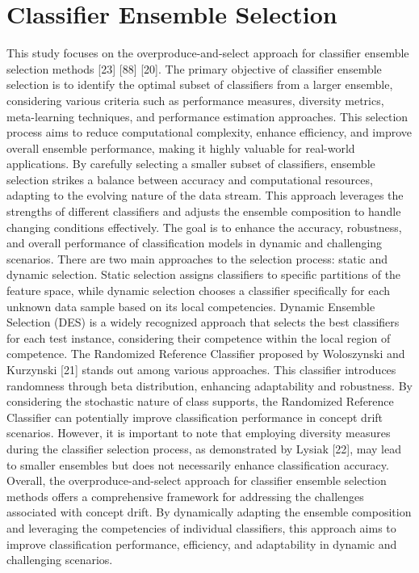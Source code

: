 %
%
\section{Classifier Ensemble Selection}

\label{sec:3_2_ensemble}
This study focuses on the overproduce-and-select approach for classifier ensemble selection methods [23] [88] [20]. The primary objective of classifier ensemble selection is to identify the optimal subset of classifiers from a larger ensemble, considering various criteria such as performance measures, diversity metrics, meta-learning techniques, and performance estimation approaches. This selection process aims to reduce computational complexity, enhance efficiency, and improve overall ensemble performance, making it highly valuable for real-world applications. By carefully selecting a smaller subset of classifiers, ensemble selection strikes a balance between accuracy and computational resources, adapting to the evolving nature of the data stream. This approach leverages the strengths of different classifiers and adjusts the ensemble composition to handle changing conditions effectively. The goal is to enhance the accuracy, robustness, and overall performance of classification models in dynamic and challenging scenarios. There are two main approaches to the selection process: static and dynamic selection. Static selection assigns classifiers to specific partitions of the feature space, while dynamic selection chooses a classifier specifically for each unknown data sample based on its local competencies. Dynamic Ensemble Selection (DES) is a widely recognized approach that selects the best classifiers for each test instance, considering their competence within the local region of competence. The Randomized Reference Classifier proposed by Woloszynski and Kurzynski [21] stands out among various approaches. This classifier introduces randomness through beta distribution, enhancing adaptability and robustness. By considering the stochastic nature of class supports, the Randomized Reference Classifier can potentially improve classification performance in concept drift scenarios. However, it is important to note that employing diversity measures during the classifier selection process, as demonstrated by Lysiak [22], may lead to smaller ensembles but does not necessarily enhance classification accuracy. Overall, the overproduce-and-select approach for classifier ensemble selection methods offers a comprehensive framework for addressing the challenges associated with concept drift. By dynamically adapting the ensemble composition and leveraging the competencies of individual classifiers, this approach aims to improve classification performance, efficiency, and adaptability in dynamic and challenging scenarios.